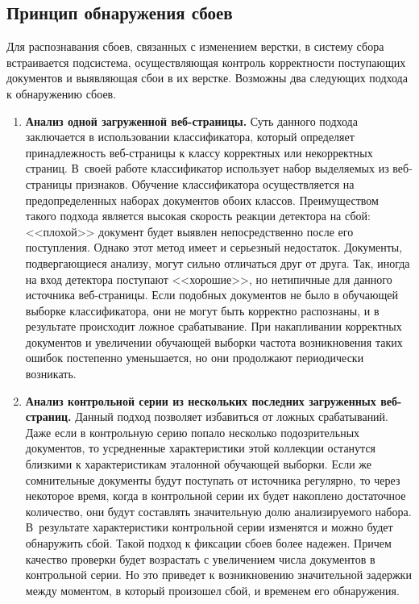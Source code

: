 \begin{multicols}{2}
\section{Принцип обнаружения сбоев}
  
    Для распознавания сбоев, связанных с изменением верстки, в систему сбора 
встраивается подсистема, осуществляющая контроль корректности 
поступающих документов и выявляющая сбои в их верстке. Возможны два 
следующих подхода к обнаружению сбоев.
  \begin{enumerate}[1.]
\item \textbf{Анализ одной загруженной веб-стра\-ни\-цы.} Суть данного подхода 
заключается в использовании классификатора, который определяет 
принадлежность веб-стра\-ни\-цы к классу корректных или некорректных 
страниц. В~своей работе классификатор использует набор выделяемых из 
веб-стра\-ни\-цы признаков. Обучение классификатора осуществляется на 
предопределенных наборах документов обоих классов. Преимуществом 
такого подхода является высокая скорость реакции детектора на сбой: 
<<плохой>> документ будет выявлен непосредственно после его 
поступления. Однако этот метод имеет и серьезный недостаток. Документы, 
подвергающиеся анализу, могут сильно отличаться друг от друга. Так, 
иногда на вход детектора поступают <<хорошие>>, но нетипичные для 
данного источника веб-стра\-ни\-цы. Если подобных документов не было в 
обучающей выборке классификатора, они не могут быть корректно 
распознаны, и в результате происходит ложное срабатывание. При 
накапливании корректных документов и увеличении обучающей выборки 
частота возникновения таких ошибок постепенно уменьшается, но они 
продолжают периодически возникать. 
\item \textbf{Анализ контрольной серии из нескольких последних загруженных 
веб-стра\-ниц.} Данный подход позволяет избавиться от ложных 
срабатываний. Даже если в контрольную серию попало несколько 
подозрительных документов, то усредненные характеристики этой 
коллекции останутся близкими к характеристикам эталонной обучающей 
выборки. Если же сомнительные документы будут поступать от источника 
регулярно, то через некоторое время, когда в контрольной серии их будет 
накоплено достаточное количество, они будут составлять значительную 
долю анализируемого набора. В~результате характеристики контрольной 
серии изменятся и можно будет обнаружить сбой. Такой подход к фиксации 
сбоев более надежен. Причем качество проверки будет возрастать с 
увеличением числа документов в контрольной серии. Но это приведет к 
возникновению значительной задержки между моментом, в который 
произошел сбой, и временем его обнаружения. 
\end{enumerate}


\end{multicols}
